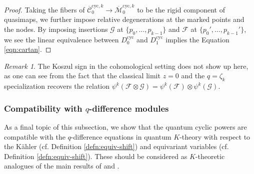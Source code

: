\documentclass[reqno]{amsart}
\numberwithin{equation}{section}
\numberwithin{equation}{section}
\numberwithin{equation}{section}
\theoremstyle{definition}
\theoremstyle{remark}
\theoremstyle{remark}
\newtheorem{rem}[thm]{Remark}
\begin{document}
\begin{proof}
     Taking the fibers of $\overline{\mathcal{C}}_{0}^{\mathrm{cyc}, k} \to \overline{\mathcal{M}}_{0}^{\mathrm{cyc}, k}$ to be the rigid component of quasimaps, we further impose relative degenerations at the marked points and the nodes. By imposing insertions $\mathcal{G}$ at $\{p_0, \dots, p_{k-1}\}$ and $\mathcal{F}$ at $\{p_0', \dots, p_{k-1}'\}$, we see the linear equivalence between $D_0^{\mathrm{cyc}}$ and $D_1^{\mathrm{cyc}}$ implies the Equation \eqref{eqn:cartan}.
\end{proof}

\begin{rem}
    The Koszul sign in the cohomological setting \cite[Proposition 4.8]{seidel-wilkins} does not show up here, as one can see from the fact that the classical limit $z=0$ and the $q = \zeta_k$ specialization recovers the relation $\psi^k(\mathcal{F} \otimes \mathcal{G}) = \psi^k(\mathcal{F}) \otimes \psi^k(\mathcal{G})$.
\end{rem}

\subsubsection{Compatibility with $q$-difference modules}\label{sec:qdiff}
As a final topic of this subsection, we show that the quantum cyclic powers are compatible with the $q$-difference equations in quantum $K$-theory with respect to the K\"ahler (cf. Definition \ref{defn:equiv-shift}) and equivariant variables (cf. Definition \ref{defn:equiv-shift}). These should be considered as $K$-theoretic analogues of the main results of \cite{seidel-wilkins} and \cite{Lee23b}.
\end{document}
